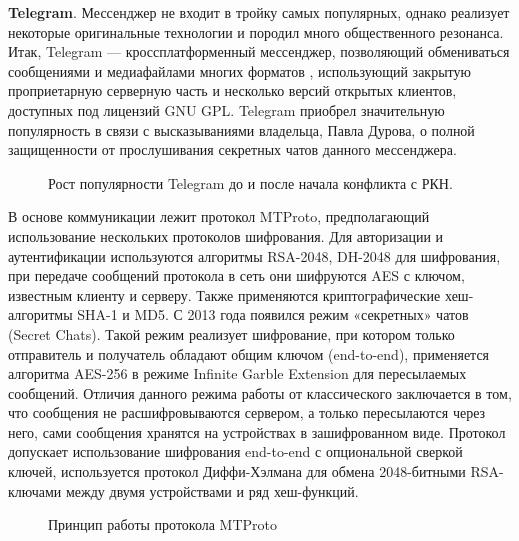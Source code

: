 \textbf{Telegram}. Мессенджер не входит в тройку самых популярных, однако реализует некоторые оригинальные технологии и породил много общественного резонанса. Итак, Telegram — кроссплатформенный мессенджер, позволяющий обмениваться сообщениями и медиафайлами многих форматов \cite{TG1} %
, использующий закрытую проприетарную  серверную часть и несколько версий открытых клиентов, доступных под лицензий GNU GPL. Telegram приобрел значительную популярность в связи с высказываниями владельца, Павла Дурова, о полной защищенности от прослушивания секретных  чатов данного мессенджера. %
\begin{figure*}[h!]
	\caption{Рост популярности Telegram до и после начала конфликта  с РКН. \cite{TG1}}
\end{figure*} 

В основе коммуникации лежит протокол MTProto, предполагающий использование нескольких протоколов шифрования. 	 Для авторизации и аутентификации используются алгоритмы RSA-2048, DH-2048 для шифрования, при передаче сообщений протокола в сеть они шифруются AES с ключом, известным клиенту и серверу. Также применяются криптографические хеш-алгоритмы SHA-1 и MD5.  С 2013 года появился режим «секретных» чатов (Secret Chats).	Такой режим реализует шифрование, при котором только  отправитель и получатель обладают общим ключом (end-to-end), применяется  алгоритма AES-256 в режиме  Infinite Garble Extension для пересылаемых сообщений. Отличия данного режима работы от классического заключается в том, что сообщения не расшифровываются сервером, а только пересылаются через него, сами сообщения хранятся на устройствах в зашифрованном виде. Протокол допускает использование шифрования end-to-end с опциональной сверкой ключей, используется  протокол Диффи-Хэлмана для обмена 2048-битными RSA-ключами между двумя устройствами и ряд хеш-функций.
\begin{figure*}[h!]
	\caption{Принцип работы протокола MTProto}
\end{figure*} 

